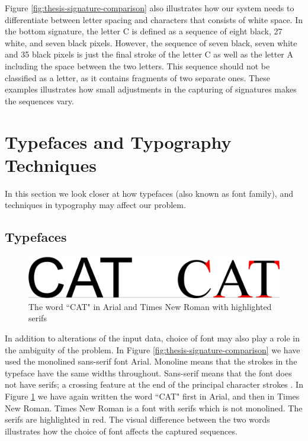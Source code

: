 Figure \ref{fig:thesis-signature-comparison} also illustrates how our system needs to differentiate between letter spacing and characters that consists of white space. In the bottom signature, the letter C is defined as a sequence of eight black, 27 white, and seven black pixels. However, the sequence of seven black, seven white and 35 black pixels is just the final stroke of the letter C as well as the letter A including the space between the two letters. This sequence should not be classified as a letter, as it contains fragments of two separate ones. These examples illustrates how small adjustments in the capturing of signatures makes the sequences vary.


\section{Typefaces and Typography Techniques}
\label{sec:use_of_fonts}
In this section we look closer at how typefaces (also known as font family), and techniques in typography may affect our problem.

\subsection{Typefaces}
\begin{figure}[h]
    \centering
    \includegraphics[width=1.0\textwidth]{fig/chapter2/typeface_comparison.png}
    \caption{The word ``CAT" in Arial and Times New Roman with highlighted serifs}
    \label{fig:typeface-comparison}
\end{figure}

In addition to alterations of the input data, choice of font may also play a role in the ambiguity of the problem. In Figure \ref{fig:thesis-signature-comparison} we have used the monolined sans-serif font Arial. Monoline means that the strokes in the typeface have the same widths throughout. Sans-serif means that the font does not have serifs; a crossing feature at the end of the principal character strokes \citep{felici2011complete}. In Figure \ref{fig:typeface-comparison} we have again written the word ``CAT" first in Arial, and then in Times New Roman. Times New Roman is a font with serifs which is not monolined. The serifs are highlighted in red. The visual difference between the two words illustrates how the choice of font affects the captured sequences.


